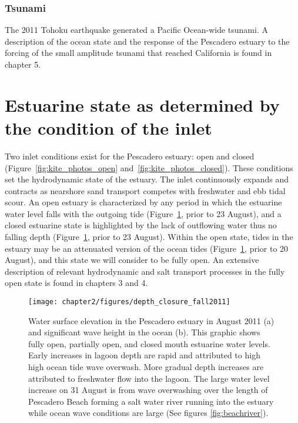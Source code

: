 \subsubsection{Tsunami}
The 2011 Tohoku earthquake generated a Pacific Ocean-wide tsunami. A description of the ocean state and the response of the Pescadero estuary to the forcing of the small amplitude tsunami that reached California is found in chapter 5.



\section{Estuarine state as determined by the condition of the inlet}
\label{betterlabelmaybe}

Two inlet conditions exist for the Pescadero estuary: open and closed (Figure~\ref{fig:kite_photos_open} and~\ref{fig:kite_photos_closed}).  These conditions set the hydrodynamic state of the estuary. The inlet continuously expands and contracts as nearshore sand transport competes with freshwater and ebb tidal scour. An open estuary is characterized by any period in which the estuarine water level falls with the outgoing tide (Figure~\ref{fig:depthclosuref11}, prior to 23 August), and a closed estuarine state is highlighted by the lack of outflowing water thus no falling depth (Figure~\ref{fig:depthclosuref11}, prior to 23 August). Within the open state, tides in the estuary may be an attenuated version of the ocean tides (Figure~\ref{fig:depthclosuref11}, prior to 20 August), and this state we will consider to be fully open. An extensive description of relevant hydrodynamic and salt transport processes in the fully open state is found in chapters 3 and 4.

\begin{figure}
\centering
	\texttt{[image: chapter2/figures/depth\_closure\_fall2011]} \caption{Water surface elevation in the Pescadero estuary in August 2011 (a) and significant wave height in the ocean (b). This graphic shows fully open, partially open, and closed mouth estuarine water levels. Early increases in lagoon depth are rapid and attributed to high high ocean tide wave overwash. More gradual depth increases are attributed to freshwater flow into the lagoon. The large water level increase on 31 August is from wave overwashing over the length of Pescadero Beach forming a salt water river running into the estuary while ocean wave conditions are large (See figures \ref{fig:beachriver}).}
	\label{fig:depthclosuref11} 
\end{figure}

